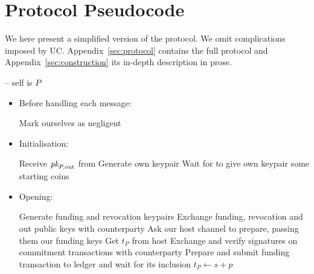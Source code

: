 \section{Protocol Pseudocode}
\label{sec:pseudocode}

We here present a simplified version of the protocol. We omit
complications imposed by UC. Appendix~\ref{sec:protocol} contains
the full protocol and Appendix~\ref{sec:construction} its in-depth
description in prose.
\ \\

\begin{center}
  \begin{processbox}{\pchan -- self is $P$}
    \begin{itemize}
      \item Before handling each message:
      \begin{algorithmic}[0]
          \State Mark ourselves as negligent 
        \EndIf
      \end{algorithmic}

      \item Initialisation:
      \begin{algorithmic}[0]
        \State Receive $\textit{pk}_{P, \mathrm{out}}$ from \environment{} 
        \State Generate own keypair
        \State Wait for \environment to give own keypair some starting coins
      \end{algorithmic}

      \item Opening:
      \begin{algorithmic}[0]
        \State Generate funding and revocation keypairs
        \State Exchange funding, revocation and out public keys with
        counterparty
          \State Ask our host channel to prepare, passing them our funding keys
          \State Get $t_P$ from host 
        \EndIf
        \State Exchange and verify signatures on commitment transactions with
        counterparty
          \State Prepare and submit funding transaction to ledger and wait for
          its inclusion 
          \State $t_P \gets s + p$ 
        \EndIf
      \end{algorithmic}


\end{itemize}
\end{processbox}
\end{center}
